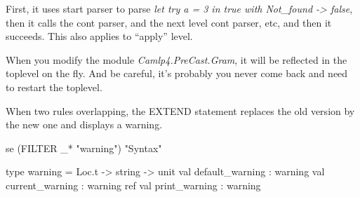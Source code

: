 First, it uses start parser to parse \textit{let try a = 3 in true
  with Not\_found -> false}, then it calls the cont parser, and the
next level cont parser, etc, and then it succeeds. This also applies
to ``apply'' level.


When you modify the module \textit{Camlp4.PreCast.Gram}, it will be
reflected in the toplevel on the fly. And be careful, it's probably you never come back and need to restart the toplevel.

When two rules overlapping, the EXTEND statement replaces the
old version by the new one and displays a warning. 

\begin{ocamlcode}
se (FILTER _* "warning") "Syntax"
\end{ocamlcode}
\begin{ocamlcode}
type warning = Loc.t -> string -> unit
val default_warning : warning
val current_warning : warning ref
val print_warning : warning
\end{ocamlcode}
  




